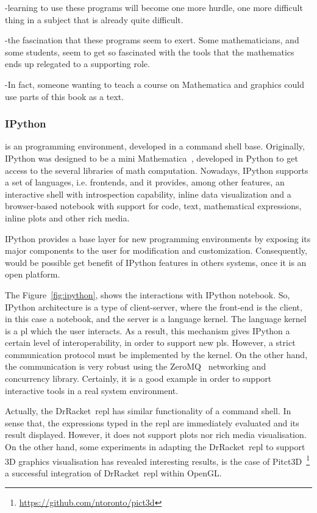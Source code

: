 -learning to use these programs will become one more hurdle, one more difficult thing in a subject that is already quite difficult.

-the fascination that these programs seem to exert. Some mathematicians, and some students, seem to get so fascinated with the tools that the mathematics ends up relegated to a supporting role.

-In fact, someone wanting to teach a course on Mathematica and graphics could use parts of this book as a text.

\subsubsection{IPython~\cite{PER-GRA:2007}} is an programming environment, developed in a command shell base. Originally, IPython was designed to be a mini Mathematica~\cite{wolfram1991mathematica}, developed in Python to get access to the several libraries of math computation. Nowadays, IPython supports a set of languages, i.e. frontends, and it provides, among other features, an interactive shell with introspection capability, inline data visualization and a browser-based notebook with support for code, text, mathematical expressions, inline plots and other rich media. 

IPython provides a base layer for new programming environments by exposing its major components to the user for modification and customization. Consequently, would be possible get benefit of IPython features in others systems, once it is an open platform.  

The Figure~\ref{fig:ipython}, shows the interactions with IPython notebook. So, IPython architecture is a type of client-server, where the front-end is the client, in this case a notebook, and the server is a language kernel. The language kernel is a \ac{pl} which the user interacts. As a result, this mechanism gives IPython a certain level of interoperability, in order to support new \ac{pl}s. However, a strict communication protocol must be implemented by the kernel. On the other hand, the communication is very robust using the ZeroMQ~\cite{hintjens2013zeromq} networking and concurrency library. Certainly, it is a good example in order to support interactive tools in a real system environment.

Actually, the DrRacket~\ac{repl} has similar functionality of a command shell. In sense that, the expressions typed in the \ac{repl} are immediately evaluated and its result displayed. However, it does not support plots nor rich media visualisation. On the other hand, some experiments in adapting the DrRacket~\ac{repl} to support 3D graphics visualisation has revealed interesting results, is the case of Pitct3D~\footnote{\url{https://github.com/ntoronto/pict3d}} a successful integration of DrRacket~\ac{repl} within OpenGL.

